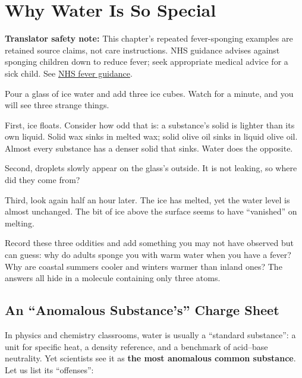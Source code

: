 \chapter{Why Water Is So Special}

\begin{kaichang}
\textbf{Translator safety note:} This chapter's repeated fever-sponging examples are retained source claims, not care instructions. NHS guidance advises against sponging children down to reduce fever; seek appropriate medical advice for a sick child. See \href{https://www.nhs.uk/symptoms/fever-in-children/}{NHS fever guidance}.

Pour a glass of ice water and add three ice cubes. Watch for a minute, and you will see three strange things.

First, ice floats. Consider how odd that is: a substance's solid is lighter than its own liquid. Solid wax sinks in melted wax; solid olive oil sinks in liquid olive oil. Almost every substance has a denser solid that sinks. Water does the opposite.

Second, droplets slowly appear on the glass's outside. It is not leaking, so where did they come from?

Third, look again half an hour later. The ice has melted, yet the water level is almost unchanged. The bit of ice above the surface seems to have ``vanished'' on melting.

Record these three oddities and add something you may not have observed but can guess: why do adults sponge you with warm water when you have a fever? Why are coastal summers cooler and winters warmer than inland ones? The answers all hide in a molecule containing only three atoms.
\end{kaichang}

\section{An ``Anomalous Substance's'' Charge Sheet}

In physics and chemistry classrooms, water is usually a ``standard substance'': a unit for specific heat, a density reference, and a benchmark of acid--base neutrality. Yet scientists see it as \textbf{the most anomalous common substance}. Let us list its ``offenses'':

